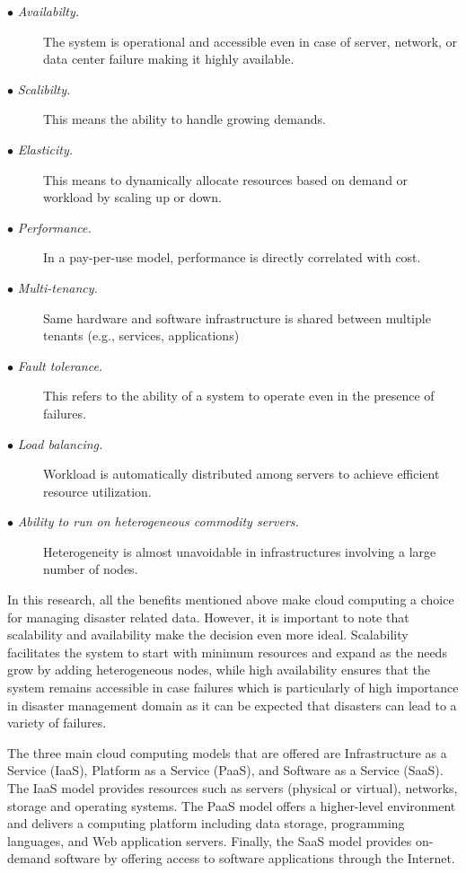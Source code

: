 \begin{description}
	\item[$\bullet$ \it Availabilty.]
	\hfill\break
	The system is operational and accessible even in case of server, network, or data center failure making it highly available.
	
	\item[$\bullet$ \it Scalibilty.]
	\hfill\break
	This means the ability to handle growing demands.
	
	\item[$\bullet$ \it Elasticity.]
	\hfill\break
	This means to dynamically allocate resources based on demand or workload by scaling up or down.
	
	\item[$\bullet$ \it Performance.]
	\hfill\break
	In a pay-per-use model, performance is directly correlated with cost.
	
	\item[$\bullet$ \it Multi-tenancy.]
	\hfill\break
	Same hardware and software infrastructure is shared between multiple tenants (e.g., services, applications)
	
	\item[$\bullet$ \it Fault tolerance.]
	\hfill\break
	This refers to the ability of a system to operate even in the presence of failures.

	\item[$\bullet$ \it Load balancing.]
	\hfill\break
	Workload is automatically distributed among servers to achieve efficient resource utilization.
	
	\item[$\bullet$ \it Ability to run on heterogeneous commodity servers.]
	\hfill\break
	Heterogeneity is almost unavoidable in infrastructures involving a large number of nodes.
\end{description}

In this research, all the benefits mentioned above make cloud computing a choice for managing disaster related data. However, it is important to note that scalability and availability make the decision even more ideal. Scalability facilitates the system to start with minimum resources and expand as the needs grow by adding heterogeneous nodes, while high availability ensures that the system remains accessible in case failures which is particularly of high importance in disaster management domain as it can be expected that disasters can lead to a variety of failures.

The three main cloud computing models that are offered are Infrastructure as a Service (IaaS), Platform as a Service (PaaS), and Software as a Service (SaaS). The IaaS model provides resources such as servers (physical or virtual), networks, storage and operating systems. The PaaS model offers a higher-level environment and delivers a computing platform including data storage, programming languages, and Web application servers. Finally, the SaaS model provides on-demand software by offering access to software applications through the Internet.

